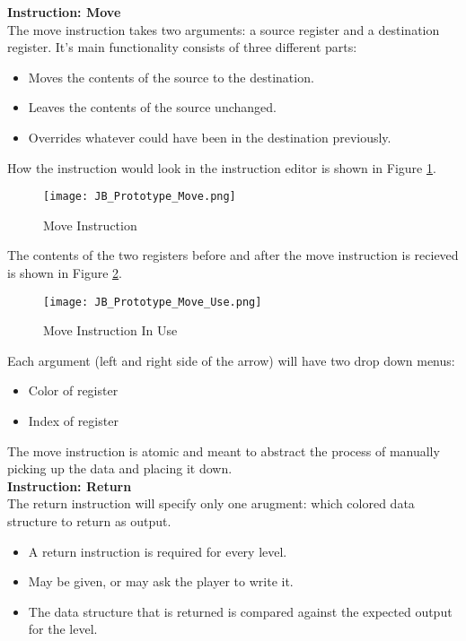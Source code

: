 \textbf{Instruction: Move}\\

The move instruction takes two arguments: a source register and a destination register.
It's main functionality consists of three different parts:

\begin{itemize}
  \item Moves the contents of the source to the destination.
  \item Leaves the contents of the source unchanged.
  \item Overrides whatever could have been in the destination previously.
\end{itemize}

How the instruction would look in the instruction editor is shown in Figure
\ref{fig:Move_Instruction}.

\begin{figure}[!hb]
  \caption{Move Instruction}
  \label{fig:Move_Instruction}
  \centering
  \texttt{[image: JB\_Prototype\_Move.png]}
\end{figure}

The contents of the two registers before and after the move instruction is
recieved is shown in Figure \ref{fig:Move_Instruction_Use}.

\begin{figure}[!hb]
  \caption{Move Instruction In Use}
  \label{fig:Move_Instruction_Use}
  \centering
  \texttt{[image: JB\_Prototype\_Move\_Use.png]}
\end{figure}

Each argument (left and right side of the arrow) will have two drop down menus:
\begin{itemize}
  \item Color of register
  \item Index of register
\end{itemize}

The move instruction is atomic and meant to abstract the process of manually
picking up the data and placing it down.\\

\textbf{Instruction: Return}\\

The return instruction will specify only one arugment: which colored data structure
to return as output.
\begin{itemize}
  \item A return instruction is required for every level.
  \item May be given, or may ask the player to write it.
  \item The data structure that is returned is compared against the expected
  output for the level.
\end{itemize}

